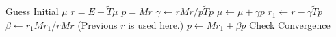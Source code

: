 \documentclass[preview=true]{standalone}
\begin{document}
\begin{algorithmic}
\State Guess Initial $\mu$
\State $r = E - \tilde{T}\mu$
\State $p = M r$
   \State $\gamma \gets r M r / p \tilde{T} p$
   \State $\mu    \gets \mu + \gamma p$
   \State $r_1    \gets r - \gamma \tilde{T} p$ 
   \State $\beta  \gets r_1 M r_1 / r M r$ (Previous $r$ is used here.)
   \State $p      \gets M r_1 + \beta p$
   \State Check Convergence
\EndWhile
\EndProcedure
\end{algorithmic}
\end{document}
